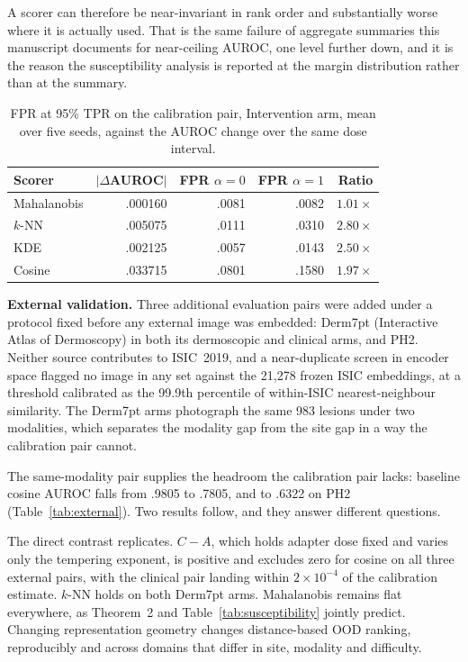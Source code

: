 \documentclass[pdflatex,sn-basic]{sn-jnl}
\theoremstyle{plain}
\theoremstyle{definition}
\theoremstyle{remark}
\begin{document}
A scorer can therefore be near-invariant in rank order and substantially worse
where it is actually used. That is the same failure of aggregate summaries this
manuscript documents for near-ceiling AUROC, one level further down, and it is
the reason the susceptibility analysis is reported at the margin distribution
rather than at the summary.

\begin{table}[t]
\centering
\caption{FPR at 95\% TPR on the calibration pair, Intervention arm, mean over five seeds, against the AUROC change over the same dose interval.}
\label{tab:fpr}
\small
\begin{tabular}{lrrrr}
\toprule
Scorer & $|\Delta$AUROC$|$ & FPR $\alpha{=}0$ & FPR $\alpha{=}1$ & Ratio\\
\midrule
Mahalanobis & .000160 & .0081 & .0082 & $1.01\times$\\
$k$-NN & .005075 & .0111 & .0310 & $2.80\times$\\
KDE & .002125 & .0057 & .0143 & $2.50\times$\\
Cosine & .033715 & .0801 & .1580 & $1.97\times$\\
\bottomrule
\end{tabular}
\end{table}

\label{sec:external}
\textbf{External validation.} Three additional evaluation pairs were added under a protocol fixed before any external image was embedded: Derm7pt (Interactive Atlas of Dermoscopy) in both its dermoscopic and clinical arms, and PH2. Neither source contributes to ISIC~2019, and a near-duplicate screen in encoder space flagged no image in any set against the 21{,}278 frozen ISIC embeddings, at a threshold calibrated as the 99.9th percentile of within-ISIC nearest-neighbour similarity. The Derm7pt arms photograph the same 983 lesions under two modalities, which separates the modality gap from the site gap in a way the calibration pair cannot.

The same-modality pair supplies the headroom the calibration pair lacks: baseline cosine AUROC falls from .9805 to .7805, and to .6322 on PH2 (Table~\ref{tab:external}). Two results follow, and they answer different questions.

The direct contrast replicates. $C-A$, which holds adapter dose fixed and varies only the tempering exponent, is positive and excludes zero for cosine on all three external pairs, with the clinical pair landing within $2\times10^{-4}$ of the calibration estimate. $k$-NN holds on both Derm7pt arms. Mahalanobis remains flat everywhere, as Theorem~2 and Table~\ref{tab:susceptibility} jointly predict. Changing representation geometry changes distance-based OOD ranking, reproducibly and across domains that differ in site, modality and difficulty.
\end{document}
